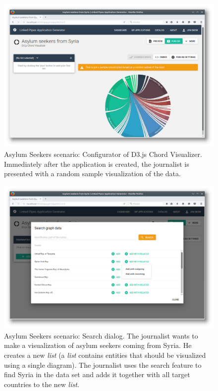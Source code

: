 \begin{figure}
	\centering
	\includegraphics[width=145mm]{img/05_scenario_04_graph_sample.png}
	\caption{Asylum Seekers scenario: Configurator of D3.js Chord Visualizer. Immediately after the application is created, the journalist is presented with a random sample visualization of the data.}
	\label{fig:scenario-04-graph-sample}
\end{figure}
\begin{figure}
	\centering
	\includegraphics[width=145mm]{img/05_scenario_05_search_graph}
	\caption{Asylum Seekers scenario: Search dialog. The journalist wants to make a visualization of asylum seekers coming from Syria. He creates a new  \emph{list} (a \emph{list} contains entities that should be visualized using a single diagram). The journalist uses the search feature to find Syria in the data set and adds it together with all target countries to the new \emph{list}.}
	\label{fig:scenario-05-search-graph}
\end{figure}
